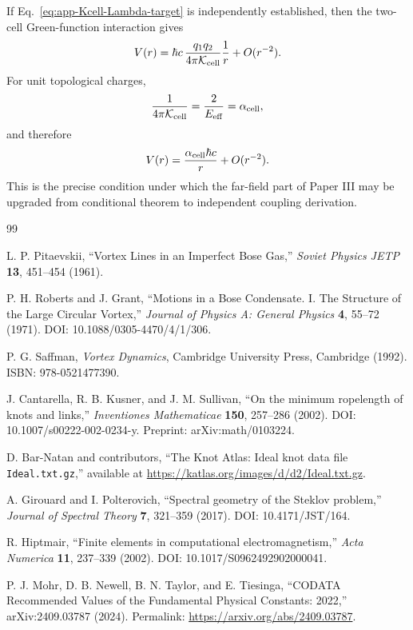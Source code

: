 \documentclass[11pt]{article}
\begin{document}
If Eq.~\eqref{eq:app-Kcell-Lambda-target} is independently established, then
the two-cell Green-function interaction gives
\begin{equation}
  V(r)
  =
  \hbar c\,
  \frac{q_1q_2}{4\pi\mathcal K_{\rm cell}}
  \frac{1}{r}
  +
  O(r^{-2}).
\end{equation}
For unit topological charges,
\begin{equation}
  \frac{1}{4\pi\mathcal K_{\rm cell}}
  =
  \frac{2}{E_{\rm eff}}
  =
  \alpha_{\rm cell},
\end{equation}
and therefore
\begin{equation}
  V(r)
  =
  \frac{\alpha_{\rm cell}\hbar c}{r}
  +
  O(r^{-2}).
\end{equation}
This is the precise condition under which the far-field part of Paper III may
be upgraded from conditional theorem to independent coupling derivation.


\begin{thebibliography}{99}

L. P. Pitaevskii, ``Vortex Lines in an Imperfect Bose Gas,''
\emph{Soviet Physics JETP} \textbf{13}, 451--454 (1961).

P. H. Roberts and J. Grant, ``Motions in a Bose Condensate. I. The Structure of the Large Circular Vortex,''
\emph{Journal of Physics A: General Physics} \textbf{4}, 55--72 (1971).
DOI: 10.1088/0305-4470/4/1/306.

P. G. Saffman, \emph{Vortex Dynamics}, Cambridge University Press, Cambridge (1992).
ISBN: 978-0521477390.

J. Cantarella, R. B. Kusner, and J. M. Sullivan,
``On the minimum ropelength of knots and links,''
\emph{Inventiones Mathematicae} \textbf{150}, 257--286 (2002).
DOI: 10.1007/s00222-002-0234-y.
Preprint: arXiv:math/0103224.

D. Bar-Natan and contributors,
``The Knot Atlas: Ideal knot data file \texttt{Ideal.txt.gz},''
available at \url{https://katlas.org/images/d/d2/Ideal.txt.gz}.

A. Girouard and I. Polterovich,
``Spectral geometry of the Steklov problem,''
\emph{Journal of Spectral Theory} \textbf{7}, 321--359 (2017).
DOI: 10.4171/JST/164.

R. Hiptmair,
``Finite elements in computational electromagnetism,''
\emph{Acta Numerica} \textbf{11}, 237--339 (2002).
DOI: 10.1017/S0962492902000041.

P. J. Mohr, D. B. Newell, B. N. Taylor, and E. Tiesinga,
``CODATA Recommended Values of the Fundamental Physical Constants: 2022,''
arXiv:2409.03787 (2024).
Permalink: \url{https://arxiv.org/abs/2409.03787}.

\end{thebibliography}
\end{document}
